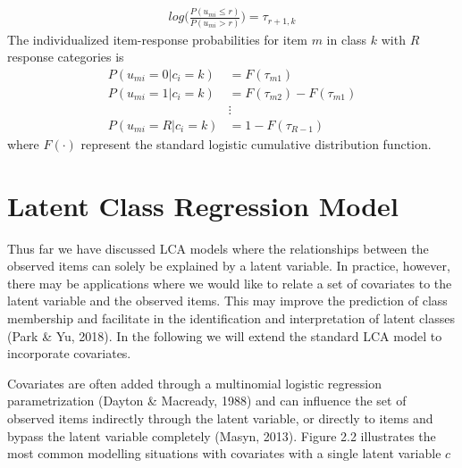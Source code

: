 \begin{align}
    log \bigg( \frac{P(u_{mi} \leq r)}{P(u_{mi} > r)} \bigg) = \tau_{r+1,k}
\end{align}The individualized item-response probabilities for item $m$ in class $k$ with $R$ response categories is
\begin{align}
    P(u_{mi}=0|c_{i}=k) &= F(\tau_{m1}) \nonumber \\
    P(u_{mi}=1|c_{i}=k) &= F(\tau_{m2}) - F(\tau_{m1}) \nonumber \\ 
    &\vdots \nonumber \\
    P(u_{mi}=R|c_{i}=k) &= 1 - F(\tau_{R-1}) 
\end{align} where $F(\cdot)$ represent the standard logistic cumulative distribution function.

\section{Latent Class Regression Model}
Thus far we have discussed LCA models where the relationships between the observed items can solely be explained by a latent variable. In practice, however, there may be applications where we would like to relate a set of covariates to the latent variable and the observed items. This may improve the prediction of class membership and facilitate in the identification and interpretation of latent classes (Park \& Yu, 2018). In the following we will extend the standard LCA model to incorporate covariates. 

Covariates are often added through a multinomial logistic regression parametrization (Dayton \& Macready, 1988) and can influence the set of observed items indirectly through the latent variable, or directly to items and bypass the latent variable completely (Masyn, 2013). Figure 2.2 illustrates the most common modelling situations with covariates with a single latent variable $c$


